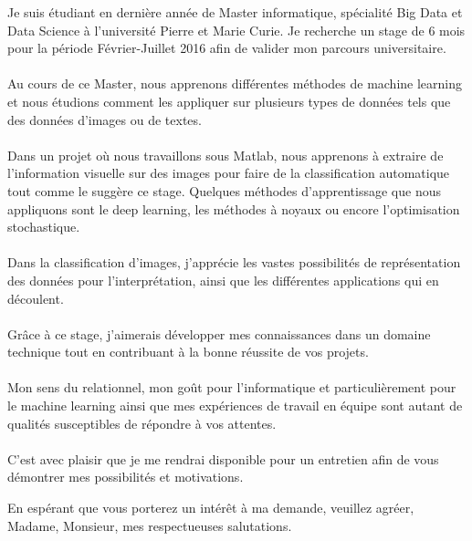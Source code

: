 \documentclass[11pt,a4paper,sans]{moderncv} %
\begin{document}
\date{} %
\opening{} %


\makelettertitle %

\begin{flushleft}
Je suis étudiant en dernière année de Master informatique, spécialité Big Data et Data Science à l'université Pierre et Marie Curie. Je recherche un stage de 6 mois pour la période Février-Juillet 2016 afin de valider mon parcours universitaire.\\~\\

Au cours de ce Master, nous apprenons différentes méthodes de machine learning et nous étudions comment les appliquer sur plusieurs types de données tels que des données d'images ou de textes.\\~\\

Dans un projet où nous travaillons sous Matlab, nous apprenons à extraire de l'information visuelle sur des images pour faire de la classification automatique tout comme le suggère ce stage. Quelques méthodes d'apprentissage que nous appliquons sont le deep learning, les méthodes à noyaux ou encore l'optimisation stochastique.\\~\\

Dans la classification d'images, j'apprécie les vastes possibilités de représentation des données pour l'interprétation, ainsi que les différentes applications qui en découlent.\\~\\
Grâce à ce stage, j'aimerais développer mes connaissances dans un domaine technique tout en contribuant à la bonne réussite de vos projets.\\~\\

Mon sens du relationnel, mon goût pour l'informatique et particulièrement pour le machine learning ainsi que mes expériences de travail en équipe sont autant de qualités susceptibles de répondre à vos attentes.\\~\\

C'est avec plaisir que je me rendrai disponible pour un entretien afin de vous démontrer mes possibilités et motivations.

\end{flushleft}


\closing{En espérant que vous porterez un intérêt à ma demande, veuillez agréer, Madame, Monsieur, mes respectueuses salutations.} %

\makeletterclosing %
\end{document}
